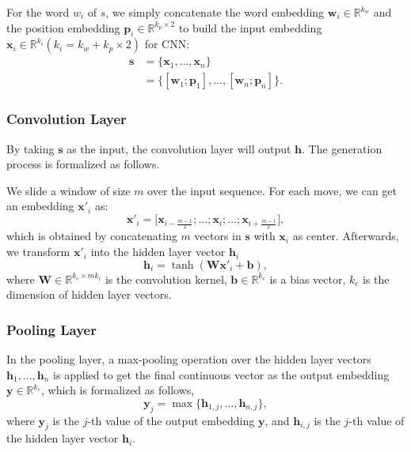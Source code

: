 \documentclass[11pt,a4paper]{article}
\begin{document}
For the word $w_i$ of $s$, we simply concatenate the word embedding $\mathbf{w}_i \in \mathbb{R}^{k_w} $ and the position embedding $\mathbf{p}_i \in \mathbb{R}^{k_p \times 2} $ to build the input embedding $\mathbf{x}_i \in \mathbb{R}^{k_i} (k_i = k_w + k_p \times 2)$ for CNN:
\begin{align}
\mathbf{s} & = \{\mathbf{x}_1,\ldots, \mathbf{x}_n\} \\\nonumber
&=\{[\mathbf{w}_1;\mathbf{p}_1],\ldots, [\mathbf{w}_n;\mathbf{p}_n]\}.
\end{align}


\subsubsection{Convolution Layer}
By taking $\mathbf{s}$ as the input, the convolution layer will output $\mathbf{h}$. The generation process is formalized as follows.

We slide a window of size $m$ over the input sequence. For each move, we can get an embedding $\mathbf{x}'_i$ as:
\begin{equation}
\mathbf{x}'_i = \big[ \mathbf{x}_{i - \frac{m-1}{2}}; \ldots ; \mathbf{x}_i; \ldots ;\mathbf{x}_{i + \frac{m-1}{2}} \big],
\end{equation}
which is obtained by concatenating $m$ vectors in $\mathbf{s}$ with $\mathbf{x}_i$ as center. Afterwards, we transform $\mathbf{x}'_i$ into the hidden layer vector $\mathbf{h}_i$
\begin{equation}
\mathbf{h}_i = \tanh(\mathbf{W}\mathbf{x}'_i + \mathbf{b}),
\end{equation}
where $\mathbf{W} \in \mathbb{R}^{k_c \times mk_i}$ is the convolution kernel, $\mathbf{b} \in \mathbb{R}^{k_c}$ is a bias vector, $k_c$ is the dimension of hidden layer vectors.

\subsubsection{Pooling Layer}
In the pooling layer, a max-pooling operation over the hidden layer vectors ${\mathbf{h}_1, \ldots , \mathbf{h}_n}$ is applied to get the final continuous vector as the output embedding $\mathbf{y} \in \mathbb{R}^{k_c} $, which is formalized as follows,
\begin{equation}
\mathbf{y}_{j} = \max \{\mathbf{h}_{1,j}, \ldots, \mathbf{h}_{n,j} \},
\end{equation}
where $\mathbf{y}_{j}$ is the $j$-th value of the output embedding $\mathbf{y}$, and $\mathbf{h}_{i,j}$ is the $j$-th value of the hidden layer vector $\mathbf{h}_i$.
\end{document}
